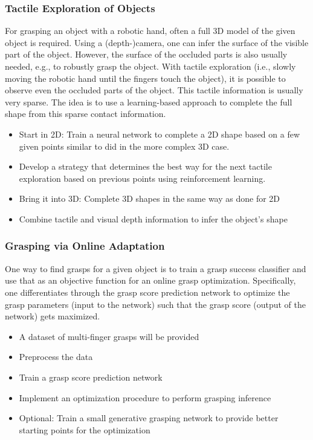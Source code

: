 \documentclass[a4paper]{article}
\begin{document}
\subsubsection{Tactile Exploration of Objects}
For grasping an object with a robotic hand, often a full 3D model of the given object is required.
Using a (depth-)camera, one can infer the surface of the visible part of the object. However, the surface of the occluded parts is also usually needed, e.g., to robustly grasp the object.
With tactile exploration (i.e., slowly moving the robotic hand until the fingers touch the object), it is possible to observe even the occluded parts of the object.
This tactile information is usually very sparse. The idea is to use a learning-based approach to complete the full shape from this sparse contact information.

\begin{itemize}
  \item Start in 2D: Train a neural network to complete a 2D shape based on a few given points similar to \citet{watkins2019multi} did in the more complex 3D case.
  \item Develop a strategy that determines the best way for the next tactile exploration based on previous points using reinforcement learning.
  \item Bring it into 3D: Complete 3D shapes in the same way as done for 2D
  \item Combine tactile and visual depth information to infer the object's shape
\end{itemize}



\subsubsection{Grasping via Online Adaptation}
One way to find grasps for a given object is to train a grasp success classifier and use that as an objective function for an online grasp optimization.
Specifically, one differentiates through the grasp score prediction network to optimize the grasp parameters (input to the network) such that the grasp score (output of the network) gets maximized.

\begin{itemize}
  \item A dataset of multi-finger grasps will be provided~\cite{winkelbauer2022}
  \item Preprocess the data
  \item Train a grasp score prediction network~\cite{van2020learning}
  \item Implement an optimization procedure to perform grasping inference
  \item Optional: Train a small generative grasping network to provide better starting points for the optimization
\end{itemize}
\end{document}
